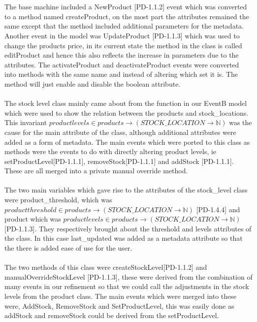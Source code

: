 \documentclass[a4paper]{article}
\begin{document}
\\\\
The base machine included a NewProduct [PD-1.1.2] event which was converted to a method named createProduct, on the most part the attributes remained the same except that the method included additional parameters for the metadata. Another event in the model was UpdateProduct  [PD-1.1.3] which was used to change the products price, in its current state the  method in the class is called editProduct and hence this also reflects the increase in parameters due to the attributes. The activateProduct and deactivateProduct events were converted into methods with the same name and instead of altering which set it is. The method will just enable and disable the boolean attribute.
\\\\
The stock level class mainly came about from the function in our EventB model which were used to show the relation between the products and stock\_locations. This invariant \(productlevels \in products →(STOCK\_LOCATION \to \mathbb{N}) \) was the cause for the main attribute of the class, although additional attributes were added as a form of metadata. The main events which were ported to this class as methods were the events to do with directly altering product levels, ie setProductLevel[PD-1.1.1], removeStock[PD-1.1.1] and addStock [PD-1.1.1]. These are all merged into a private manual override method.
\\\\
The two main variables which gave rise to the attributes of the stock\_level class were product\_threshold, which was \(productthreshold \in products \to (STOCK\_LOCATION \to \mathbb{N}) \) [PD-1.4.4] and product which was \( productlevels \in products \to(STOCK\_LOCATION \to \mathbb{N}) \) [PD-1.1.3]. They respectively brought about the threshold and levels attributes of the class. In this case last\_updated was added as a metadata attribute so that the there is added ease of use for the user. 
\\\\
The two methods of this class were createStockLevel[PD-1.1.2] and manualOverrideStockLevel [PD-1.1.3], these were derived from the combination of many events in our refinement so that we could call the adjustments in the stock levels from the product class. The main events which were merged into these were, AddStock, RemoveStock and SetProductLevel, this was easily done as addStock and removeStock could be derived from the setProductLevel. 
\\\\
\end{document}
